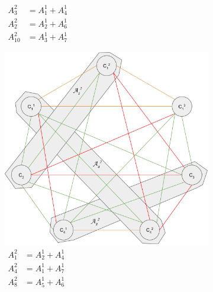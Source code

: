 \begin{figure}[h]
\begin{subfigure}[b]{\sfwidth}
    \caption[caption]{$\begin{aligned}
              A_3^2    &= A_1^1 + A_4^1\\
              A_2^2    &= A_2^1 + A_6^1\\
              A_{10}^2 &= A_3^1 + A_7^1
            \end{aligned}$}
  \end{subfigure}
  \begin{subfigure}[b]{\sfwidth}
    \includegraphics[width=\textwidth]{img/split-2-class_2.png}
    \caption[caption]{$\begin{aligned}
              A_1^2 &= A_2^1 + A_4^1\\
              A_4^2 &= A_1^1 + A_7^1\\
              A_8^2 &= A_5^1 + A_6^1
             \end{aligned}$}
  \end{subfigure}
  \begin{subfigure}[b]{\sfwidth}

\end{subfigure}
\end{figure}

